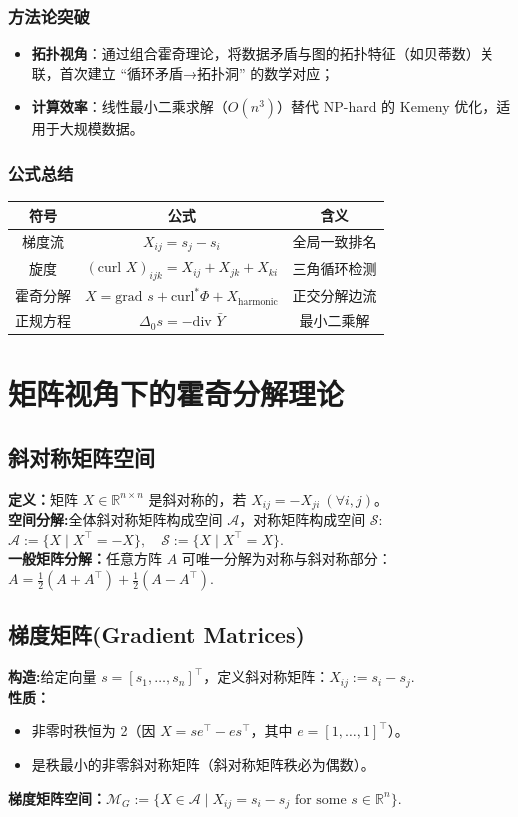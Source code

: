 \documentclass[a4paper]{article}
\begin{document}
\subsubsection{方法论突破}
\begin{itemize}
    \item \textbf{拓扑视角}：通过组合霍奇理论，将数据矛盾与图的拓扑特征（如贝蒂数）关联，首次建立 “循环矛盾→拓扑洞” 的数学对应；
    \item \textbf{计算效率}：线性最小二乘求解（$O(n^3)$）替代 NP-hard 的 Kemeny 优化，适用于大规模数据。
\end{itemize}

\subsubsection{公式总结}
\begin{center}
\begin{tabular}{ccc}
符号 & 公式 & 含义 \\ \hline
梯度流 & $X_{ij} = s_j - s_i$ & 全局一致排名 \\
旋度 & $(\text{curl } X)_{ijk} = X_{ij} + X_{jk} + X_{ki}$ & 三角循环检测 \\
霍奇分解 & $X = \text{grad } s + \text{curl}^* \Phi + X_{\text{harmonic}}$ & 正交分解边流 \\
正规方程 & $\Delta_0 s = -\text{div } \bar{Y}$ & 最小二乘解
\end{tabular}
\end{center}


\section{矩阵视角下的霍奇分解理论}
\subsection{斜对称矩阵空间}
\indent \textbf{定义：}矩阵 $X \in \mathbb{R}^{n \times n}$ 是斜对称的，若 $X_{ij} = -X_{ji} \ (\forall i,j)$。\\
\indent \textbf{空间分解:}全体斜对称矩阵构成空间 $\mathcal{A}$，对称矩阵构成空间 $\mathcal{S}$:$\mathcal{A} := \{ X \mid X^\top = -X \}, \quad \mathcal{S} := \{ X \mid X^\top = X \}.$\\
\indent \textbf{一般矩阵分解：}任意方阵 $A$ 可唯一分解为对称与斜对称部分：$A = \frac{1}{2}(A + A^\top) + \frac{1}{2}(A - A^\top).$

\subsection{梯度矩阵(Gradient Matrices)}
\indent \textbf{构造:}给定向量 $s = [s_1, \ldots, s_n]^\top$，定义斜对称矩阵：$X_{ij} := s_i - s_j.$\\
\indent \textbf{性质：}   
\begin{itemize}
    \item 非零时秩恒为 2（因 $X = se^\top - es^\top$，其中 $e = [1, \ldots, 1]^\top$）。
    \item 是秩最小的非零斜对称矩阵（斜对称矩阵秩必为偶数）。
\end{itemize}
\indent \textbf{梯度矩阵空间：}$\mathcal{M}_G := \{ X \in \mathcal{A} \mid X_{ij} = s_i - s_j \text{ for some } s \in \mathbb{R}^n \}.$
\end{document}
